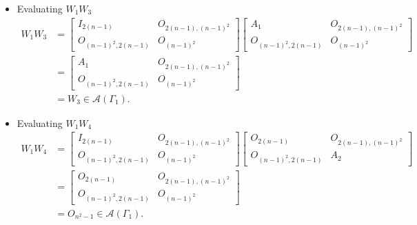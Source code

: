 \begin{itemize}
    \item Evaluating $W_1W_3$
    \begin{align*}
        W_1W_3
        &= \begin{bmatrix}
            I_{2(n-1)} & O_{2(n-1), (n-1)^2} \\
            O_{(n-1)^2, 2(n-1)} & O_{(n-1)^2}
        \end{bmatrix}\begin{bmatrix}
            A_1 & O_{2(n-1), (n-1)^2} \\
            O_{(n-1)^2, 2(n-1)} & O_{(n-1)^2}
        \end{bmatrix} \\
        &= \begin{bmatrix}
            A_1 & O_{2(n-1), (n-1)^2} \\
            O_{(n-1)^2, 2(n-1)} & O_{(n-1)^2}
        \end{bmatrix} \\
        &= W_3 \in\mathcal{A}(\Gamma_1).
    \end{align*}
    
    \item Evaluating $W_1W_4$
    \begin{align*}
        W_1W_4
        &= \begin{bmatrix}
            I_{2(n-1)} & O_{2(n-1), (n-1)^2} \\
            O_{(n-1)^2, 2(n-1)} & O_{(n-1)^2}
        \end{bmatrix}\begin{bmatrix}
            O_{2(n-1)} & O_{2(n-1), (n-1)^2} \\
            O_{(n-1)^2, 2(n-1)} & A_2
        \end{bmatrix}\\
        &= \begin{bmatrix}
            O_{2(n-1)} & O_{2(n-1), (n-1)^2} \\
            O_{(n-1)^2, 2(n-1)} & O_{(n-1)^2}
        \end{bmatrix}\\
        &= O_{n^2-1} \in \mathcal{A}(\Gamma_1).
    \end{align*}
    

\end{itemize}
